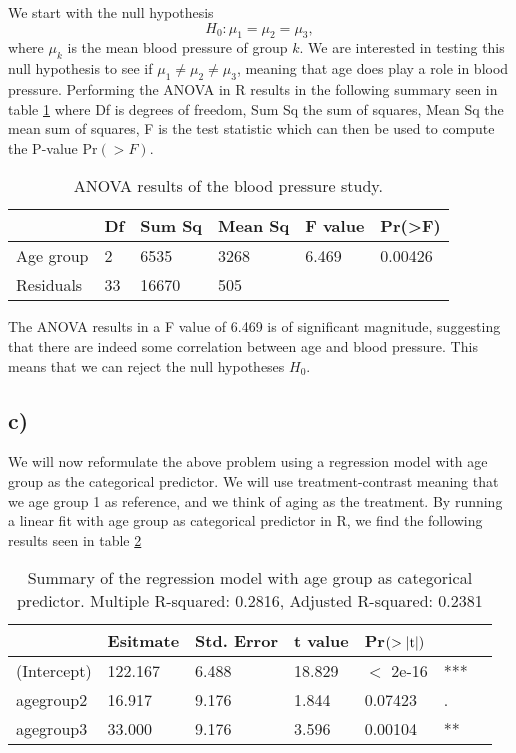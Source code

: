 \documentclass[a4paper, 10pt, reqno]{amsart}
\begin{document}
We start with the null hypothesis
\begin{equation}
    H_0: \mu_1 = \mu_2 = \mu_3,
\end{equation}
where $\mu_k$ is the mean blood pressure of group $k$. We are interested in testing this null hypothesis to see if $\mu_1 \neq \mu_2 \neq \mu_3$, meaning that age does play a role in blood pressure. Performing the ANOVA in R results in the following summary seen in table \ref{tab: anova} where Df is degrees of freedom, Sum Sq the sum of squares, Mean Sq the mean sum of squares, F is the test statistic which can then be used to compute the P-value Pr$(>F)$.  

\begin{table}
\caption{ANOVA results of the blood pressure study.}
\label{tab: anova}
\begin{tabular}{llllll}
\hline\hline
          & Df & Sum Sq & Mean Sq & F value & Pr(\textgreater{}F) \\ \hline
Age group & 2  & 6535   & 3268    & 6.469   & 0.00426             \\
Residuals & 33 & 16670  & 505     &         &\\       
\hline
\end{tabular}
\end{table}


The ANOVA results in a F value of 6.469 is of significant magnitude, suggesting that there are indeed some correlation between age and blood pressure. This means that we can reject the null hypotheses $H_0$.

\subsection{c)}
We will now reformulate the above problem using a regression model with age group as the categorical predictor. We will use treatment-contrast meaning that we age group 1 as reference, and we think of aging as the treatment. By running a linear fit with age group as categorical predictor in R, we find the following results seen in table \ref{tab: catelin}

\begin{table}
\caption{Summary of the regression model with age group as categorical predictor. Multiple R-squared:  0.2816,	Adjusted R-squared:  0.2381 }
\label{tab: catelin}
\begin{tabular}{lllllll}
\hline\hline
 & Esitmate  & Std. Error & t value & Pr$(>\abs{\mathrm{t}})$ & \\ \hline
(Intercept) & 122.167    &  6.488  &18.829&  $<$ 2e-16& ***\\
agegroup2 &    16.917   &   9.176 &  1.844 & 0.07423 &.  \\
agegroup3   &  33.000   &   9.176  & 3.596&  0.00104 &** \\
\hline
\end{tabular}
\end{table}
\end{document}
